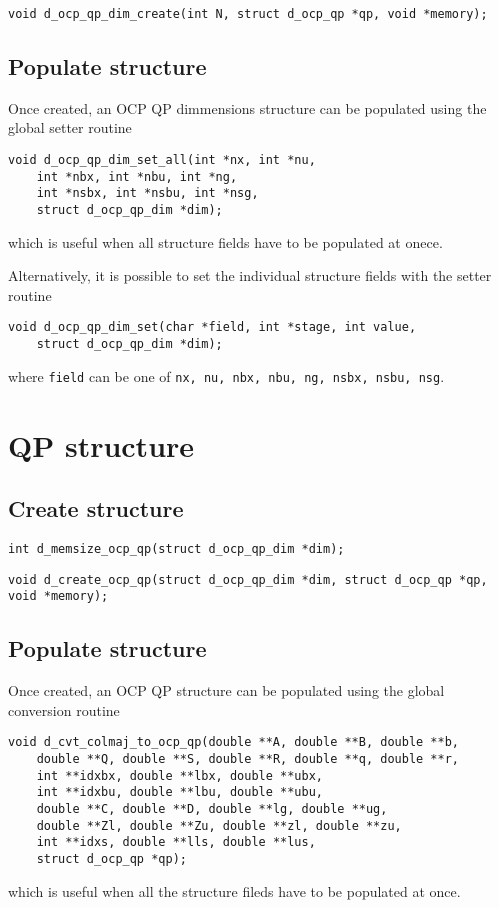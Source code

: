\documentclass[a4paper]{report}
\begin{document}
\begin{verbatim}
void d_ocp_qp_dim_create(int N, struct d_ocp_qp *qp, void *memory);
\end{verbatim}

\subsection{Populate structure}

Once created, an OCP QP dimmensions structure can be populated using the global setter routine
\begin{verbatim}
void d_ocp_qp_dim_set_all(int *nx, int *nu,
    int *nbx, int *nbu, int *ng,
    int *nsbx, int *nsbu, int *nsg,
    struct d_ocp_qp_dim *dim);
\end{verbatim}
which is useful when all structure fields have to be populated at onece.

Alternatively, it is possible to set the individual structure fields with the setter routine
\begin{verbatim}
void d_ocp_qp_dim_set(char *field, int *stage, int value,
    struct d_ocp_qp_dim *dim);
\end{verbatim}
where {\tt field} can be one of {\tt nx, nu, nbx, nbu, ng, nsbx, nsbu, nsg}.

\section{QP structure}

\subsection{Create structure}

\begin{verbatim}
int d_memsize_ocp_qp(struct d_ocp_qp_dim *dim);
\end{verbatim}

\begin{verbatim}
void d_create_ocp_qp(struct d_ocp_qp_dim *dim, struct d_ocp_qp *qp, void *memory);
\end{verbatim}

\subsection{Populate structure}

Once created, an OCP QP structure can be populated using the global conversion routine
\begin{verbatim}
void d_cvt_colmaj_to_ocp_qp(double **A, double **B, double **b, 
    double **Q, double **S, double **R, double **q, double **r, 
    int **idxbx, double **lbx, double **ubx, 
    int **idxbu, double **lbu, double **ubu, 
    double **C, double **D, double **lg, double **ug, 
    double **Zl, double **Zu, double **zl, double **zu, 
    int **idxs, double **lls, double **lus,
    struct d_ocp_qp *qp);
\end{verbatim}
which is useful when all the structure fileds have to be populated at once.
\end{document}
